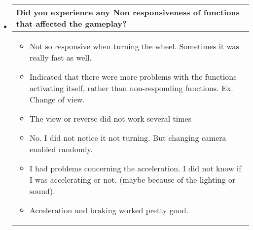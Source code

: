 \begin{itemize}
\item[]
\begin{table}[!htb]
\centering
\begin{tabular}{| p{5.5in} |}
\hline
	\cellcolor{NotSkyBlue}\textbf{Did you experience any Non responsiveness of functions that affected the gameplay?}
	\\
	\hline
	\begin{itemize}
        \item Not so responsive when turning the wheel. Sometimes it was really fast as well.
        \item Indicated that there were more problems with the functions activating itself, rather than non-responding functions. Ex. Change of view.
        \item The view or reverse did not work several times
        \item No. I did not notice it not turning. But changing camera enabled randomly.
        \item I had problems concerning the acceleration. I did not know if I was accelerating or not. (maybe because of the lighting or sound).
        \item Acceleration and braking worked pretty good.
	\end{itemize}
	\\
	\hline
\end{tabular}
\end{table}


\end{itemize}
